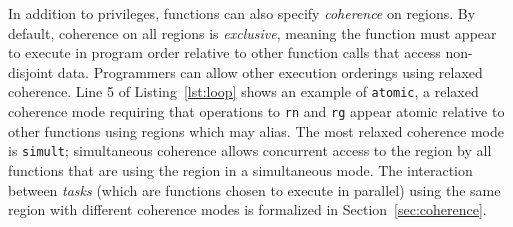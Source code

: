 In addition to privileges, functions can also specify {\em coherence}
on regions.  By default, coherence on all regions is {\em exclusive}, meaning
the function must appear to execute in program order relative to other function
calls that access non-disjoint data.  Programmers can allow other
execution orderings using relaxed coherence.  Line 5 of Listing~\ref{lst:loop} shows
an example of {\tt atomic}, a relaxed coherence mode requiring
that operations to {\tt rn} and {\tt rg} appear atomic relative
to other functions using regions which may alias.  The most relaxed coherence
mode is {\tt simult}; simultaneous coherence allows concurrent access 
to the region by all functions that are using the region
in a simultaneous mode.  The interaction between {\em tasks} (which are functions 
chosen to execute in parallel) using the same region with different coherence
modes is formalized in Section~\ref{sec:coherence}.





